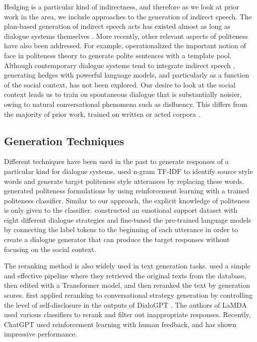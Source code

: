 \documentclass[11pt]{article}
\begin{document}
Hedging is a particular kind of indirectness, and therefore as we look at prior work in the area, we include approaches to the generation of indirect speech. The plan-based generation of indirect speech acts has existed almost as long as dialogue systems themselves \citep{clark1979responding, brown1980characterizing, perrault1980plan}. More recently, other relevant aspects of politeness have also been addressed. For example, \citet{Porayska2004modelling} operationalized the important notion of face in politeness theory to generate polite sentences with a template pool. Although contemporary dialogue systems tend to integrate indirect speech \citep{miehle2022say, briggs2017enabling}, generating hedges with powerful language models, and particularly as a function of the social context, has not been explored. Our desire to look at the social context leads us to train on spontaneous dialogue that is substantially noisier, owing to natural conversational phenomena such as disfluency. This differs from the majority of prior work, trained on written or acted corpora \citep{li-etal-2017-dailydialog, rashkin2019towards}. 

\subsection{Generation Techniques} \label{generation_tech}

Different techniques have been used in the past to generate responses of a particular kind for dialogue systems. \citet{madaan2020politeness} used n-gram TF-IDF to identify source style words and generate target politeness style utterances by replacing these words. \citet{niu2018polite} generated politeness formulations by using reinforcement learning with a trained politeness classifier. Similar to our approach, the explicit knowledge of politeness is only given to the classifier. \citet{liu2021towards} constructed an emotional support dataset with eight different dialogue strategies and fine-tuned the pre-trained language models by connecting the label tokens to the beginning of each utterance in order to create a dialogue generator that can produce the target responses without focusing on the social context.

The reranking method is also widely used in text generation tasks. \citet{hossain2020simple} used a simple and effective pipeline where they retrieved the original texts from the database, then edited with a Transformer \citep{vaswani2017attention} model, and then reranked the text by generation scores. \citet{soni2021enhancing} first applied reranking to conversational strategy generation by controlling the level of self-disclosure in the outputs of DialoGPT \citep{zhang2019dialogpt}. The authors of LaMDA \citep{thoppilan2022lamda} used various classifiers to rerank and filter out inappropriate responses. Recently, ChatGPT \citep{chatGPT2023} used reinforcement learning with human feedback, and has shown impressive performance. 
\end{document}
